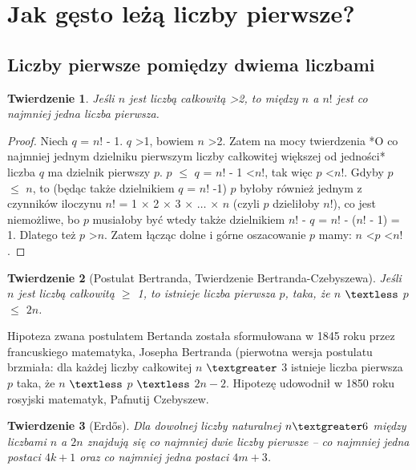 \documentclass[10pt,onecolumn]{article}
\newtheorem{theorem}{Twierdzenie}
\theoremstyle{definition}
\theoremstyle{hypothesis}
\theoremstyle{capability}
\begin{document}
\section{Jak gęsto leżą liczby pierwsze?}

\subsection{Liczby pierwsze pomiędzy dwiema liczbami}

\begin{theorem}
Jeśli $n$ jest liczbą całkowitą \textgreater 2, to między $n$ a $n!$ jest co najmniej jedna liczba pierwsza.
\end{theorem}

\begin{proof}
Niech $q$ = $n!$ - 1. $q$ \textgreater 1, bowiem $n$ \textgreater 2. Zatem na mocy twierdzenia *O co najmniej jednym dzielniku pierwszym liczby całkowitej większej od jedności* liczba $q$ ma dzielnik pierwszy $p$. $p$ $\leq$ $q$ = $n!$ - 1 \textless $n!$, tak więc $p$ \textless $n!$. Gdyby $p$ $\leq$ $n$, to (będąc także dzielnikiem $q$ = $n!$ -1) $p$ byłoby również jednym z czynników iloczynu $n!$ = 1 $\times$ 2 $\times$ 3 $\times$ $\ldots$ $\times$ $n$ (czyli $p$ dzieliłoby $n!$), co jest niemożliwe, bo $p$ musiałoby być wtedy także dzielnikiem $n!$ - $q$ = $n!$ - ($n!$ - 1) = 1. Dlatego też $p$ \textgreater $n$. Zatem łącząc dolne i górne oszacowanie $p$ mamy: $n$ \textless $p$ \textless $n!$.
\end{proof}

\begin{theorem}[Postulat Bertranda, Twierdzenie Bertranda-Czebyszewa]
Jeśli $n$ jest liczbą całkowitą $\geq$ 1, to istnieje liczba pierwsza $p$, taka, że $n$ $\textless$ $p$ $\leq$ $2n$.
\end{theorem}

Hipoteza zwana postulatem Bertanda została sformułowana w 1845 roku przez francuskiego matematyka, Josepha Bertranda (pierwotna wersja postulatu brzmiała:  dla każdej liczby całkowitej $n$ $\textgreater$ $3$ istnieje liczba pierwsza $p$ taka, że $n$ $\textless$ $p$ $\textless$ $2n-2$. Hipotezę udowodnił w 1850 roku rosyjski matematyk, Pafnutij Czebyszew.

\begin{theorem}[Erdős]
Dla dowolnej liczby naturalnej $n \textgreater 6$  między liczbami $n$ a $2n$ znajdują się co najmniej dwie liczby pierwsze – co najmniej jedna postaci $4k+1$ oraz co najmniej jedna postaci $4m+3$. 
\end{theorem}
\end{document}
